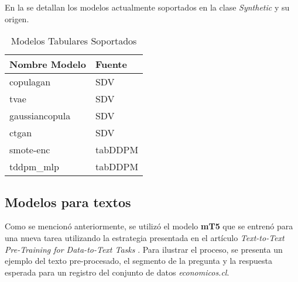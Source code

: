 En la  se detallan los modelos actualmente soportados en la clase \emph{Synthetic} y su origen.

\begin{table}[H]
	\centering
	\caption{Modelos Tabulares Soportados}
	\label{modelos-tab-soportados}
    \begin{tabular}{|l|l|}
        \hline
        \rowcolor[gray]{0.8}
        Nombre Modelo & Fuente \\
        \hline
        copulagan & SDV \cite{kotelnikov_overview_nodate} \\
        \hline
        tvae & SDV \cite{kotelnikov_overview_nodate} \\
        \hline
        gaussiancopula & SDV \cite{kotelnikov_overview_nodate} \\
        \hline
        ctgan & SDV \cite{kotelnikov_overview_nodate} \\
        \hline
        smote-enc & tabDDPM \cite{akim_tabddpm_2023} \\
        \hline
        tddpm\_mlp & tabDDPM \cite{akim_tabddpm_2023} \\
        \hline
      \end{tabular}        
\end{table} 
\newpage
\subsection{Modelos para textos}
Como se mencionó anteriormente, se utilizó el modelo \textbf{mT5} que se entrenó para una nueva tarea utilizando la estrategia presentada en el artículo \emph{Text-to-Text Pre-Training for Data-to-Text Tasks} \cite{kale_text--text_2020}. Para ilustrar el proceso, se presenta un ejemplo del texto pre-procesado, el segmento de la pregunta y la respuesta esperada para un registro del conjunto de datos \emph{economicos.cl}.

